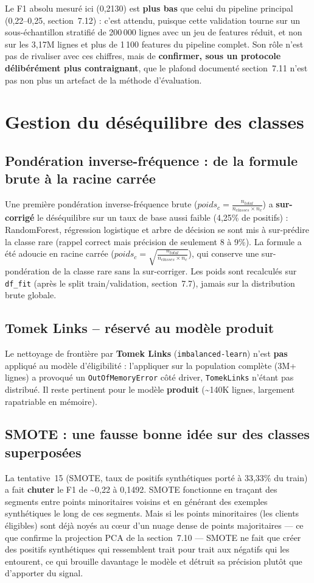 \documentclass[11pt,a4paper]{report}
\begin{document}
Le F1 absolu mesuré ici (0,2130) est \textbf{plus bas} que celui du
pipeline principal (0,22--0,25, section~7.12) : c'est attendu, puisque
cette validation tourne sur un sous-échantillon stratifié de 200\,000
lignes avec un jeu de features réduit, et non sur les 3,17M lignes et
plus de 1\,100 features du pipeline complet. Son rôle n'est pas de
rivaliser avec ces chiffres, mais de \textbf{confirmer, sous un protocole
délibérément plus contraignant}, que le plafond documenté section~7.11
n'est pas non plus un artefact de la méthode d'évaluation.

\section{Gestion du déséquilibre des classes}
\statutFait{}

\subsection{Pondération inverse-fréquence : de la formule brute à la racine carrée}
Une première pondération inverse-fréquence brute
($poids_c = \frac{n_{total}}{n_{classes}\times n_c}$) a
\textbf{sur-corrigé} le déséquilibre sur un taux de base aussi faible
(4,25\% de positifs) : RandomForest, régression logistique et arbre de
décision se sont mis à sur-prédire la classe rare (rappel correct mais
précision de seulement 8 à 9\%). La formule a été adoucie en racine carrée
($poids_c = \sqrt{\frac{n_{total}}{n_{classes}\times n_c}}$), qui conserve
une sur-pondération de la classe rare sans la sur-corriger. Les poids sont
recalculés sur \texttt{df\_fit} (après le split train/validation,
section~7.7), jamais sur la distribution brute globale.

\subsection{Tomek Links -- réservé au modèle produit}
Le nettoyage de frontière par \textbf{Tomek Links} (\texttt{imbalanced-learn})
n'est \textbf{pas} appliqué au modèle d'éligibilité : l'appliquer sur la
population complète (3M+ lignes) a provoqué un \texttt{OutOfMemoryError}
côté driver, \texttt{TomekLinks} n'étant pas distribué. Il reste pertinent
pour le modèle \textbf{produit} (\textasciitilde 140K lignes, largement
rapatriable en mémoire).

\subsection{SMOTE : une fausse bonne idée sur des classes superposées}
La tentative~15 (SMOTE, taux de positifs synthétiques porté à 33,33\% du
train) a fait \textbf{chuter} le F1 de \textasciitilde 0,22 à 0,1492. SMOTE
fonctionne en traçant des segments entre points minoritaires voisins et en
générant des exemples synthétiques le long de ces segments. Mais si les
points minoritaires (les clients éligibles) sont déjà noyés au cœur d'un
nuage dense de points majoritaires — ce que confirme la projection PCA de
la section~7.10 — SMOTE ne fait que créer des positifs synthétiques qui
ressemblent trait pour trait aux négatifs qui les entourent, ce qui brouille
davantage le modèle et détruit sa précision plutôt que d'apporter du
signal.
\end{document}
